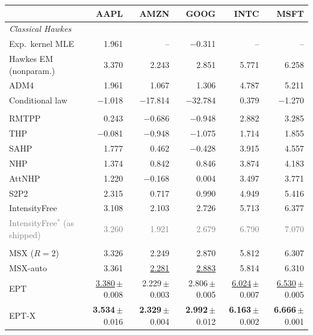 \begin{tabular}{lrrrrr}
\toprule
& AAPL & AMZN & GOOG & INTC & MSFT \\
\midrule
\multicolumn{6}{l}{\textit{Classical Hawkes}} \\[1pt]
\quad Exp.\ kernel MLE & 1.961 & -- & $-$0.311 & -- & -- \\
\quad Hawkes EM (nonparam.) & 3.370 & 2.243 & 2.851 & 5.771 & 6.258 \\
\quad ADM4 & 1.961 & 1.067 & 1.306 & 4.787 & 5.211 \\
\quad Conditional law & $-$1.018 & $-$17.814 & $-$32.784 & 0.379 & $-$1.270 \\
\addlinespace[3pt]\multicolumn{6}{l}{\textit{Neural TPPs (EasyTPP, our runs)}} \\[1pt]
\quad RMTPP & 0.243 & $-$0.686 & $-$0.948 & 2.882 & 3.285 \\
\quad THP & $-$0.081 & $-$0.948 & $-$1.075 & 1.714 & 1.855 \\
\quad SAHP & 1.777 & 0.462 & $-$0.428 & 3.915 & 4.557 \\
\quad NHP & 1.374 & 0.842 & 0.846 & 3.874 & 4.183 \\
\quad AttNHP & 1.220 & $-$0.168 & 0.004 & 3.497 & 3.771 \\
\quad S2P2 & 2.315 & 0.717 & 0.990 & 4.949 & 5.416 \\
\quad IntensityFree & 3.108 & 2.103 & 2.726 & 5.713 & 6.377 \\
\quad \textcolor{gray}{IntensityFree$^\ast$ (as shipped)} & \textcolor{gray}{3.260} & \textcolor{gray}{1.921} & \textcolor{gray}{2.679} & \textcolor{gray}{6.790} & \textcolor{gray}{7.070} \\
\addlinespace[3pt]\multicolumn{6}{l}{\textit{Ours}} \\[1pt]
\rowcolor{oursbg} \quad MSX ($R=2$) & 3.326 & 2.249 & 2.870 & 5.812 & 6.307 \\
\rowcolor{oursbg} \quad MSX-auto & 3.361 & \underline{2.281} & \underline{2.883} & 5.814 & 6.310 \\
\rowcolor{oursbg} \quad EPT & \underline{3.380}{\scriptsize\,$\pm$0.008} & 2.229{\scriptsize\,$\pm$0.003} & 2.806{\scriptsize\,$\pm$0.005} & \underline{6.024}{\scriptsize\,$\pm$0.007} & \underline{6.530}{\scriptsize\,$\pm$0.005} \\
\rowcolor{oursbg} \quad EPT-X & \textbf{3.534}{\scriptsize\,$\pm$0.016} & \textbf{2.329}{\scriptsize\,$\pm$0.004} & \textbf{2.992}{\scriptsize\,$\pm$0.012} & \textbf{6.163}{\scriptsize\,$\pm$0.002} & \textbf{6.666}{\scriptsize\,$\pm$0.001} \\
\bottomrule
\end{tabular}